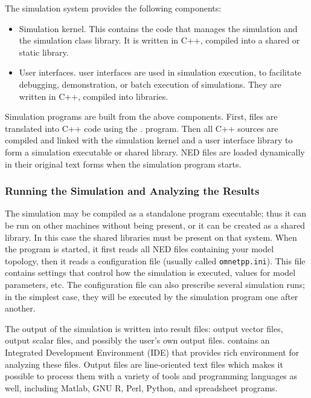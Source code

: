 The simulation system provides the following components:
\begin{itemize}
  \item{Simulation kernel. This contains the
    code that manages the simulation and the simulation class library.
    It is written in C++, compiled into a shared or static library.}
  \item{User interfaces.
     {\opp} user interfaces
    are used in simulation execution, to facilitate debugging,
    demonstration, or batch execution of simulations. They are
    written in C++, compiled into libraries.}
\end{itemize}


Simulation programs are built from the above components. First,
 files are translated into C++ code using the .
program. Then all C++ sources are compiled and linked with the simulation
kernel and a user interface library to form a simulation executable or
shared library. NED files are loaded dynamically in their original
text forms when the simulation program starts.


\subsubsection{Running the Simulation and Analyzing the Results}
\label{sec:overview:running-simulation-and-analyzing-results}

The simulation may be compiled as a standalone program executable;
thus it can be run on other machines without {\opp}
being present, or it can be created as a shared library. In this case the
{\opp} shared libraries must be present on that system.
When the program is started, it first reads all NED files
containing your model topology, then it reads a configuration
file (usually called
\texttt{omnetpp.ini}). This file contains settings that
control how the simulation is executed, values for model parameters, etc.
The configuration file can also prescribe several simulation runs; in
the simplest case, they will be executed by the simulation program one
after another.

The output of the simulation is written into result files: output vector
files, output scalar files,
and possibly the user's own output files.
{\opp} contains an Integrated Development Environment (IDE) that provides
rich environment for analyzing these files. Output files are line-oriented
text files which makes it possible to process them with a variety of tools
and programming languages as well, including Matlab, GNU R, Perl, Python,
and spreadsheet programs.


